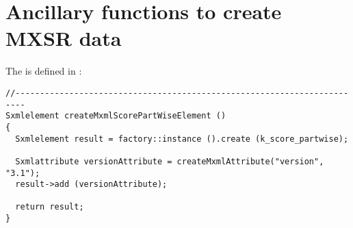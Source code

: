 \section{Ancillary functions to create MXSR data}

The  is defined in :
\begin{lstlisting}[language=CPlusPlus]
//------------------------------------------------------------------------
Sxmlelement createMxmlScorePartWiseElement ()
{
  Sxmlelement result = factory::instance ().create (k_score_partwise);

  Sxmlattribute versionAttribute = createMxmlAttribute("version", "3.1");
  result->add (versionAttribute);

  return result;
}
\end{lstlisting}


